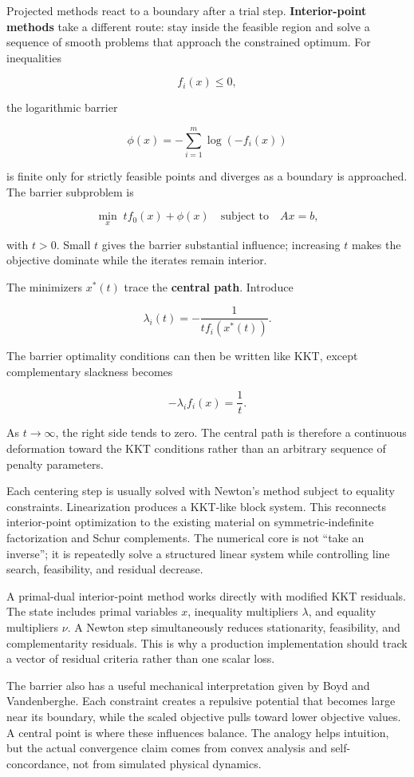 Projected methods react to a boundary after a trial step. \textbf{Interior-point methods} take a different route: stay inside the feasible region and solve a sequence of smooth problems that approach the constrained optimum. For inequalities

\[
f_i(x)\le0,
\]

the logarithmic barrier

\[
\phi(x)
=
-\sum_{i=1}^{m}\log(-f_i(x))
\]

is finite only for strictly feasible points and diverges as a boundary is approached. The barrier subproblem is

\[
\min_x\;
t f_0(x)+\phi(x)
\quad
\text{subject to}\quad Ax=b,
\]

with \(t>0\). Small \(t\) gives the barrier substantial influence; increasing \(t\) makes the objective dominate while the iterates remain interior.

The minimizers \(x^*(t)\) trace the \textbf{central path}. Introduce

\[
\lambda_i(t)
=
-\frac{1}{t f_i(x^*(t))}.
\]

The barrier optimality conditions can then be written like KKT, except complementary slackness becomes

\[
-\lambda_i f_i(x)=\frac{1}{t}.
\]

As \(t\rightarrow\infty\), the right side tends to zero. The central path is therefore a continuous deformation toward the KKT conditions rather than an arbitrary sequence of penalty parameters.

Each centering step is usually solved with Newton's method subject to equality constraints. Linearization produces a KKT-like block system. This reconnects interior-point optimization to the existing material on symmetric-indefinite factorization and Schur complements. The numerical core is not ``take an inverse''; it is repeatedly solve a structured linear system while controlling line search, feasibility, and residual decrease.

A primal-dual interior-point method works directly with modified KKT residuals. The state includes primal variables \(x\), inequality multipliers \(\lambda\), and equality multipliers \(\nu\). A Newton step simultaneously reduces stationarity, feasibility, and complementarity residuals. This is why a production implementation should track a vector of residual criteria rather than one scalar loss.

The barrier also has a useful mechanical interpretation given by Boyd and Vandenberghe. Each constraint creates a repulsive potential that becomes large near its boundary, while the scaled objective pulls toward lower objective values. A central point is where these influences balance. The analogy helps intuition, but the actual convergence claim comes from convex analysis and self-concordance, not from simulated physical dynamics.


